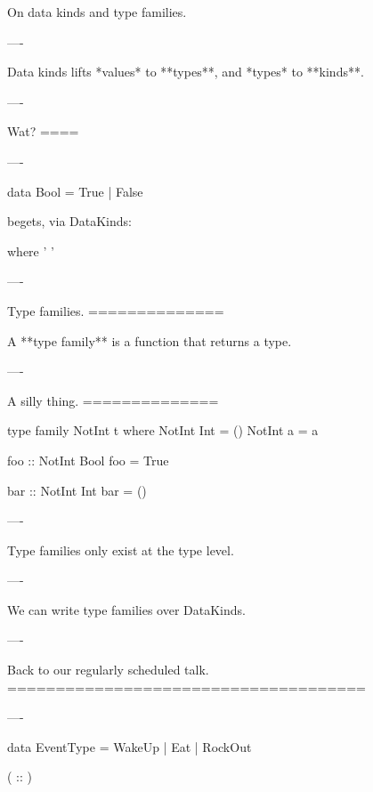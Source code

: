On data kinds and type families.

----

Data kinds lifts *values* to **types**, and *types* to **kinds**.

----

Wat?
====

----

\begin{hs}
  data Bool = True
            | False
\end{hs}

\begin{raw}
\end{raw}


begets, via DataKinds:

\begin{custom}

    where
     '
     '
\end{custom}

----

Type families.
==============

A **type family** is a function that returns a type.

----

A silly thing.
==============

\begin{hs}
  type family NotInt t where
    NotInt Int = ()
    NotInt a   = a

  foo :: NotInt Bool
  foo = True

  bar :: NotInt Int
  bar = ()
\end{hs}

----

Type families only exist at the type level.

----

We can write type families over DataKinds.

----

Back to our regularly scheduled talk.
=====================================

----

\begin{hs}

  data EventType = WakeUp | Eat | RockOut
\end{hs}

\begin{custom}
    ( :: )
\end{custom}

